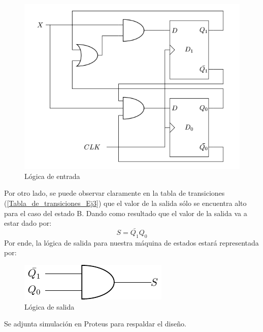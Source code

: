  \begin{figure}[H]
\begin{center}
\includegraphics[scale=0.5]{Ejercicio3/Circuitos/LogicaEj3}
\caption{Lógica de entrada}
\end{center}
\label{Logica_de_entrada_Ej3}
\end{figure}

Por otro lado, se puede observar claramente en la tabla de transiciones (\ref{Tabla_de_transiciones_Ej3}) que el valor de la salida sólo se encuentra alto para el caso del estado B. Dando como resultado que el valor de la salida va a estar dado por:
\begin{equation}
S=\bar{Q_1}Q_0
\end{equation}
Por ende, la lógica de salida para nuestra máquina de estados estará representada por:
 \begin{figure}[H]
\begin{center}
\includegraphics[scale=0.75]{Ejercicio3/Circuitos/SalidaEj3}
\caption{Lógica de salida}
\end{center}
\label{Logica_de_salida_Ej3}
\end{figure}

Se adjunta simulación en Proteus para respaldar el diseño.

